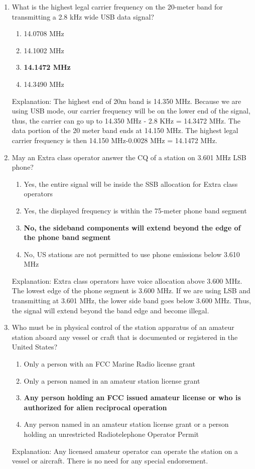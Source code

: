 \begin{enumerate}
        \item What is the highest legal carrier frequency on the 20-meter band for transmitting a 2.8 kHz wide USB data signal?
    \begin{enumerate}
        \item 14.0708 MHz
         \item  14.1002 MHz
         \item \textbf {14.1472 MHz}
        \item  14.3490 MHz
    \end{enumerate}
    \textcolor{myred}{Explanation:}
    The highest end of 20m band is 14.350 MHz. Because we are using USB mode, our carrier frequency will be on the lower end of the signal, thus, the carrier can go up to 14.350 MHz - 2.8 KHz = 14.3472 MHz. The data portion of the 20 meter band ends at 14.150 MHz. The highest legal carrier frequency is then 14.150 MHz-0.0028 MHz = 14.1472 MHz.

    
        \item May an Extra class operator answer the CQ of a station on 3.601 MHz LSB phone?
    \begin{enumerate}
        \item Yes, the entire signal will be inside the SSB allocation for Extra class operators
        \item  Yes, the displayed frequency is within the 75-meter phone band segment
        \item \textbf {No, the sideband components will extend beyond the edge of the phone band segment}
         \item  No, US stations are not permitted to use phone emissions below 3.610 MHz
        \end{enumerate}
         \textcolor{myred}{Explanation:}
          Extra class operators have voice allocation above 3.600 MHz. The lowest edge of the phone segment is 3.600 MHz. If we are using LSB and transmitting at 3.601 MHz, the lower side band goes below 3.600 MHz. Thus, the signal will extend beyond the band edge and become illegal.
          
      \item Who must be in physical control of the station apparatus of an amateur station aboard any vessel or craft that is documented or registered in the United States?
\begin{enumerate}
   \item Only a person with an FCC Marine Radio license grant
\item  Only a person named in an amateur station license grant
\item \textbf {Any person holding an FCC issued amateur license or who is authorized for alien reciprocal operation}
\item  Any person named in an amateur station license grant or a person holding an unrestricted Radiotelephone Operator Permit
\end{enumerate}
\textcolor{myred}{Explanation:}
Any licensed amateur operator can operate the station on a vessel or aircraft. There is no need for any special endorsement.
 

\end{enumerate}
